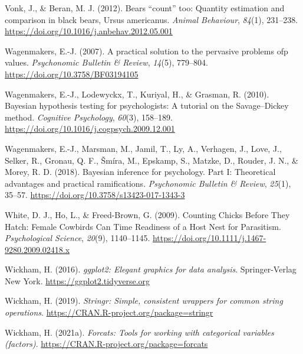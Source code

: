 \documentclass[
  ,doc,floatsintext]{apa6}
\newlength{\cslhangindent}
\newlength{\cslentryspacingunit} %
\newenvironment{CSLReferences}[2] %
 {%
  \setlength{\parindent}{0pt}
  \ifodd #1
  \let\oldpar\par
  \def\par{\hangindent=\cslhangindent\oldpar}
  \fi
  \setlength{\parskip}{#2\cslentryspacingunit}
 }%
 {}
\begin{document}
\begin{CSLReferences}{1}{0}
\leavevmode{}%
Vonk, J., \& Beran, M. J. (2012). Bears {``count''} too: Quantity estimation and comparison in black bears, {Ursus} americanus. \emph{Animal Behaviour}, \emph{84}(1), 231--238. \url{https://doi.org/10.1016/j.anbehav.2012.05.001}

\leavevmode{}%
Wagenmakers, E.-J. (2007). A practical solution to the pervasive problems ofp values. \emph{Psychonomic Bulletin \& Review}, \emph{14}(5), 779--804. \url{https://doi.org/10.3758/BF03194105}

\leavevmode{}%
Wagenmakers, E.-J., Lodewyckx, T., Kuriyal, H., \& Grasman, R. (2010). Bayesian hypothesis testing for psychologists: {A} tutorial on the {Savage}--{Dickey} method. \emph{Cognitive Psychology}, \emph{60}(3), 158--189. \url{https://doi.org/10.1016/j.cogpsych.2009.12.001}

\leavevmode{}%
Wagenmakers, E.-J., Marsman, M., Jamil, T., Ly, A., Verhagen, J., Love, J., Selker, R., Gronau, Q. F., Šmíra, M., Epskamp, S., Matzke, D., Rouder, J. N., \& Morey, R. D. (2018). Bayesian inference for psychology. {Part} {I}: {Theoretical} advantages and practical ramifications. \emph{Psychonomic Bulletin \& Review}, \emph{25}(1), 35--57. \url{https://doi.org/10.3758/s13423-017-1343-3}

\leavevmode{}%
White, D. J., Ho, L., \& Freed-Brown, G. (2009). Counting {Chicks} {Before} {They} {Hatch}: {Female} {Cowbirds} {Can} {Time} {Readiness} of a {Host} {Nest} for {Parasitism}. \emph{Psychological Science}, \emph{20}(9), 1140--1145. \url{https://doi.org/10.1111/j.1467-9280.2009.02418.x}

\leavevmode{}%
Wickham, H. (2016). \emph{ggplot2: Elegant graphics for data analysis}. Springer-Verlag New York. \url{https://ggplot2.tidyverse.org}

\leavevmode{}%
Wickham, H. (2019). \emph{Stringr: Simple, consistent wrappers for common string operations}. \url{https://CRAN.R-project.org/package=stringr}

\leavevmode{}%
Wickham, H. (2021a). \emph{Forcats: Tools for working with categorical variables (factors)}. \url{https://CRAN.R-project.org/package=forcats}


\end{CSLReferences}
\end{document}
